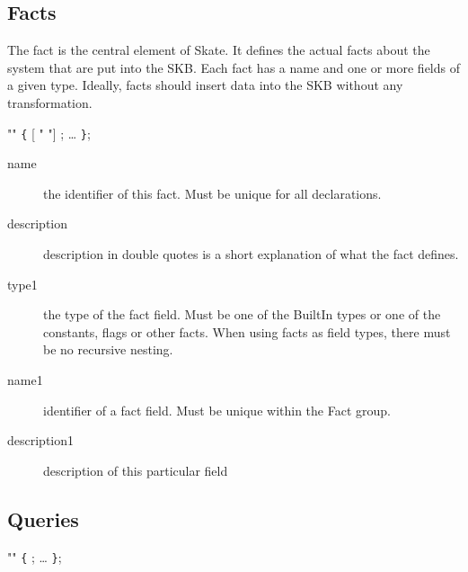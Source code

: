 \documentclass[a4paper,11pt,twoside]{report}
\begin{document}
{{\subsection{Facts}

The fact is the central element of Skate. It defines the actual facts about the
system that are put into the SKB. Each fact has a name and one or more fields
of a given type. Ideally, facts should insert data into the SKB without any 
transformation.

\begin{syntax}
   "" \verb+{+
      [ " "] ;
    \ldots
\verb+}+;
\end{syntax}

\begin{description}
    \item[name] the identifier of this fact. Must be unique for all 
                declarations.
    
    \item[description] description in double quotes is a short explanation of
                       what the fact defines.
    
    \item[type1] the type of the fact field. Must be one of the BuiltIn types
                 or one of the constants, flags or other facts. When using 
                 facts as field types, there must be no recursive nesting.

    \item [name1] identifier of a fact field. Must be unique within the 
                  Fact group.   
    
    \item [description1] description of this particular field
\end{description}



\subsection{Queries}


\begin{syntax}
  "" \verb+{+
    ;
    \ldots
\verb+}+;
\end{syntax}

}}
\end{document}
